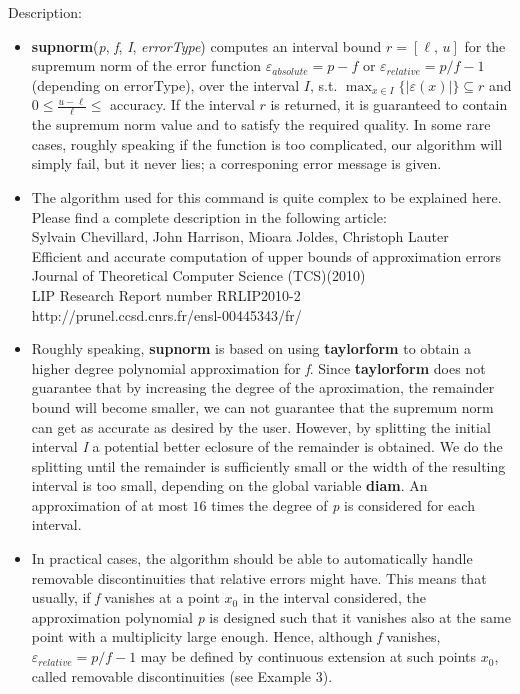\noindent Description: \begin{itemize}

\item \textbf{supnorm}(\emph{p}, \emph{f}, \emph{I}, \emph{errorType}) computes an interval bound $r = [\ell,\,u]$ for the supremum norm of the error function $\varepsilon_{absolute}=p-f$ or $\varepsilon_{relative}=p/f-1$ (depending on errorType), over the interval $I$, s.t.  $\max_{x \in I} \{|\varepsilon(x)|\} \subseteq r$ and  $0 \le \frac{u-\ell}{\ell} \le$ accuracy. If the interval $r$ is returned, it is guaranteed to contain the supremum norm value and to satisfy the required quality. In some rare cases, roughly speaking if the function is too complicated, our algorithm will simply fail, but it never lies; a corresponing error message is given. 

\item The algorithm used for this command is quite complex to be explained here. 
   Please find a complete description in the following article:\\
      Sylvain Chevillard, John Harrison, Mioara Joldes, Christoph Lauter\\
      Efficient and accurate computation of upper bounds of approximation errors\\
      Journal of Theoretical Computer Science (TCS)(2010)\\
      LIP Research Report number RRLIP2010-2\\
      http://prunel.ccsd.cnrs.fr/ensl-00445343/fr/\\

\item Roughly speaking, \textbf{supnorm} is based on using \textbf{taylorform} to obtain a higher degree polynomial approximation for \emph{f}. Since \textbf{taylorform} does not guarantee that by increasing the degree of the aproximation, the remainder bound will become smaller, we can not guarantee that the supremum norm can get as accurate as desired by the user. However, by splitting the initial interval \emph{I} a potential better eclosure of the remainder is obtained. We do the splitting until the remainder is sufficiently small or the width of the resulting interval is too small, depending on the global variable \textbf{diam}. An approximation of at most $16$ times the degree of \emph{p} is considered for each interval.

\item In practical cases, the algorithm should be able to automatically handle removable discontinuities that relative errors might have. This means that usually, if \emph{f} vanishes at a point $x_0$ in the interval considered, the approximation polynomial \emph{p} is designed such that it vanishes also at the same point with a multiplicity large enough. Hence, although \emph{f} vanishes, $\varepsilon_{relative}=p/f-1$ may be defined by continuous extension at such points $x_0$, called removable discontinuities (see Example $3$).
\end{itemize}
